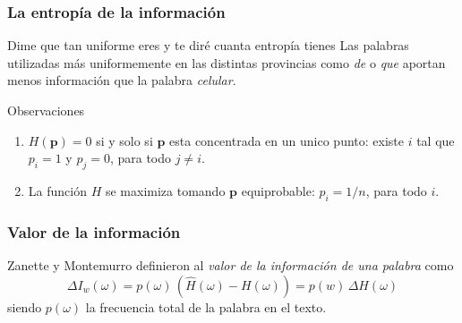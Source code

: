 \begin{frame}[t]\frametitle{La entropía de la información}
    

{
    \begin{exampleblock}{Dime que tan uniforme eres y te diré cuanta entropía tienes} Las palabras utilizadas más uniformemente en las distintas provincias como \textit{de} o \textit{que} aportan menos información que la palabra \textit{celular}. 
\end{exampleblock}
}

{
    \begin{block}{Observaciones}
        \begin{enumerate}
            \item $H(\mathbf{p})=0$ si y solo si $\mathbf{p}$ esta concentrada en un unico punto: existe $i$ tal que $p_i=1$ y $p_j=0$, para todo $j\not=i$. 
            \item La funci\'on $H$ se maximiza tomando $\mathbf{p}$ equiprobable: $p_i=1/n$, para todo $i$. 

        \end{enumerate}

    \end{block}
}
\end{frame}



\begin{frame}[t]\frametitle{Valor de la información}
    Zanette y Montemurro definieron al \textit{valor de la información de una palabra} como
 \begin{equation}
  \Delta I_w(\omega) = p(\omega) \,  (\widehat{H}(\omega) - H(\omega))  =  p(w) \, \Delta{H(\omega)}
 \end{equation}
siendo $p(\omega)$ la frecuencia total de la palabra en el texto.


\end{frame}

